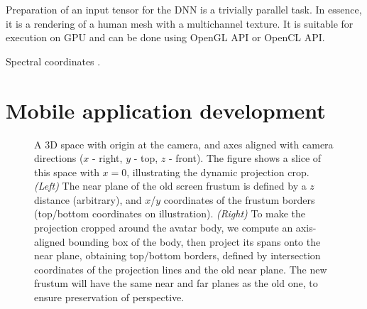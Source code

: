 Preparation of an input tensor for the DNN is a trivially parallel task. In essence, it is a rendering of a human mesh with a multichannel texture. It is suitable for execution on GPU and can be done using OpenGL API or OpenCL API.

Spectral coordinates \cite{aux:spectral10}.

\section{Mobile application development}
\label{methods:app}
\begin{figure}
	\centering
	\caption{A 3D space with origin at the camera, and axes aligned with camera directions ($x$ - right, $y$ - top, $z$ - front). The figure shows a slice of this space with $x=0$, illustrating the dynamic projection crop. \textit{(Left)} The near plane of the old screen frustum is defined by a $z$ distance (arbitrary), and $x$/$y$ coordinates of the frustum borders (top/bottom coordinates on illustration). \textit{(Right)} To make the projection cropped around the avatar body, we compute an axis-aligned bounding box of the body, then project its spans onto the near plane, obtaining top/bottom borders, defined by intersection coordinates of the projection lines and the old near plane. The new frustum will have the same near and far planes as the old one, to ensure preservation of perspective.}
	\label{fig:dynamic_crop_math}
\end{figure}

